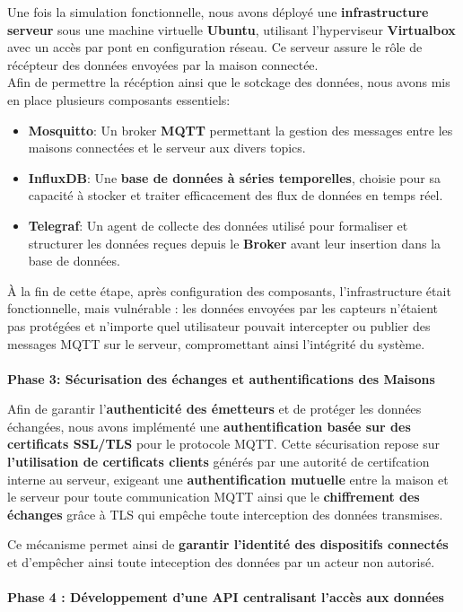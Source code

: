 \documentclass[10pt, a4paper]{report}
\begin{document}
	Une fois la simulation fonctionnelle, nous avons déployé une \textbf{infrastructure serveur} sous une machine virtuelle \textbf{Ubuntu}, utilisant l'hyperviseur \textbf{Virtualbox} avec un accès par pont en configuration réseau. Ce serveur assure le rôle de récépteur des données envoyées par la maison connectée.\\
	Afin de permettre la récéption ainsi que le sotckage des données, nous avons mis en place plusieurs composants essentiels:
	\begin{itemize}
		\item \textbf{Mosquitto}: Un broker \textbf{MQTT} permettant la gestion des messages entre les maisons connectées et le serveur aux divers topics.
		\item \textbf{InfluxDB}: Une \textbf{base de données à séries temporelles}, choisie pour sa capacité à stocker et traiter efficacement des flux de données en temps réel.
		\item \textbf{Telegraf}: Un agent de collecte des données utilisé pour formaliser et structurer les données reçues depuis le \textbf{Broker} avant leur insertion dans la base de données.\\
	\end{itemize}
	
	À la fin de cette étape, après configuration des composants, l’infrastructure était fonctionnelle, mais vulnérable : les données envoyées par les capteurs n’étaient pas protégées et n’importe quel utilisateur pouvait intercepter ou publier des messages MQTT sur le serveur, compromettant ainsi l’intégrité du système.\\\\
	\textbf{Phase 3: Sécurisation des échanges et authentifications des Maisons}
	
	Afin de garantir l'\textbf{authenticité des émetteurs} et de protéger les données échangées, nous avons implémenté une \textbf{authentification basée sur des certificats SSL/TLS} pour le protocole MQTT. Cette sécurisation repose sur \textbf{l'utilisation de certificats clients} générés par une autorité de certifcation interne au serveur, exigeant une \textbf{authentification mutuelle} entre la maison et le serveur pour toute communication MQTT ainsi que le \textbf{chiffrement des échanges} grâce à TLS qui empêche toute interception des données transmises.
	
	Ce mécanisme permet ainsi de \textbf{garantir l'identité des dispositifs connectés} et d'empêcher ainsi toute inteception des données par un acteur non autorisé.\\\\
	\textbf{Phase 4 : Développement d’une API centralisant l’accès aux données}
	
\end{document}
